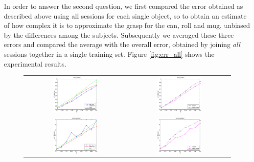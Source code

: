 In order to answer the second question, we first compared the error
obtained as described above using all sessions for each single object,
so to obtain an estimate of how complex it is to approximate the grasp
for the can, roll and mug, unbiased by the differences among the
subjects. Subsequently we averaged these three errors and compared the
average with the overall error, obtained by joining \emph{all}
sessions together in a single training set. Figure \ref{fig:err_all}
shows the experimental results.

\begin{figure}[htbp]
  \begin{center}
    \begin{tabular}{cc}
      \includegraphics[width=0.45\textwidth]{error_pos.eps} &
      \includegraphics[width=0.45\textwidth]{error_cmp_pos.eps} \\
      \includegraphics[width=0.45\textwidth]{error_ori.eps} &
      \includegraphics[width=0.45\textwidth]{error_cmp_ori.eps} \\

\end{tabular}
\end{center}
\end{figure}
